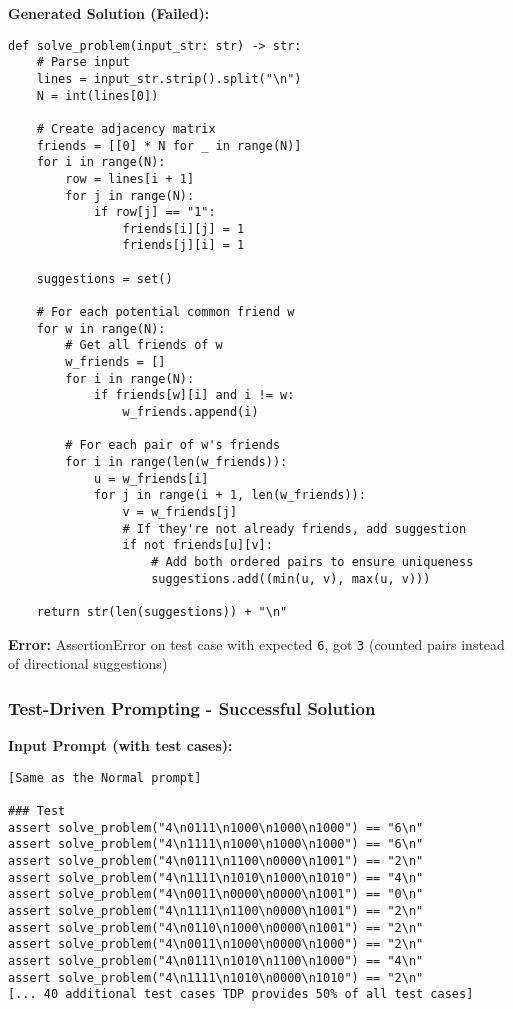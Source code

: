 \documentclass{article}
\begin{document}
\textbf{Generated Solution (Failed):}
\begin{lstlisting}
def solve_problem(input_str: str) -> str:
    # Parse input
    lines = input_str.strip().split("\n")
    N = int(lines[0])

    # Create adjacency matrix
    friends = [[0] * N for _ in range(N)]
    for i in range(N):
        row = lines[i + 1]
        for j in range(N):
            if row[j] == "1":
                friends[i][j] = 1
                friends[j][i] = 1

    suggestions = set()

    # For each potential common friend w
    for w in range(N):
        # Get all friends of w
        w_friends = []
        for i in range(N):
            if friends[w][i] and i != w:
                w_friends.append(i)

        # For each pair of w's friends
        for i in range(len(w_friends)):
            u = w_friends[i]
            for j in range(i + 1, len(w_friends)):
                v = w_friends[j]
                # If they're not already friends, add suggestion
                if not friends[u][v]:
                    # Add both ordered pairs to ensure uniqueness
                    suggestions.add((min(u, v), max(u, v)))

    return str(len(suggestions)) + "\n"
\end{lstlisting}

\textbf{Error:} AssertionError on test case with expected \texttt{6}, got \texttt{3} (counted pairs instead of directional suggestions)

\subsubsection{Test-Driven Prompting - Successful Solution}

\textbf{Input Prompt (with test cases):}
\begin{lstlisting}
[Same as the Normal prompt]

### Test
assert solve_problem("4\n0111\n1000\n1000\n1000") == "6\n"
assert solve_problem("4\n1111\n1000\n1000\n1000") == "6\n"
assert solve_problem("4\n0111\n1100\n0000\n1001") == "2\n"
assert solve_problem("4\n1111\n1010\n1000\n1010") == "4\n"
assert solve_problem("4\n0011\n0000\n0000\n1001") == "0\n"
assert solve_problem("4\n1111\n1100\n0000\n1001") == "2\n"
assert solve_problem("4\n0110\n1000\n0000\n1001") == "2\n"
assert solve_problem("4\n0011\n1000\n0000\n1000") == "2\n"
assert solve_problem("4\n0111\n1010\n1100\n1000") == "4\n"
assert solve_problem("4\n1111\n1010\n0000\n1010") == "2\n"
[... 40 additional test cases TDP provides 50% of all test cases]
\end{lstlisting}
\end{document}
